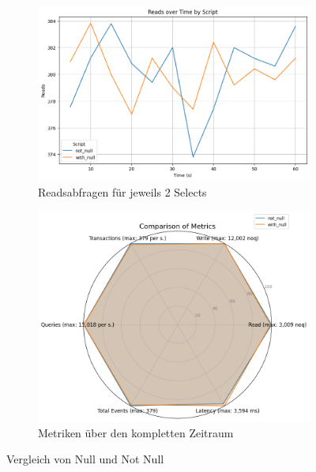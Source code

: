 \vspace{-15pt}
\begin{figure}[H]
    \centering
    \begin{subfigure}[t]{0.48\textwidth}
        \centering
        \includegraphics[width=\textwidth]{PNGs/Script/Data_Types/Null/null-check/Reads}
        \caption{Readsabfragen für jeweils 2 Selects}
        \label{data-types-null-reads}
    \end{subfigure}
    \hfill
    \begin{subfigure}[t]{0.48\textwidth}
        \centering
        \includegraphics[width=\textwidth]{PNGs/Script/Data_Types/Null/null-check/statistics}
        \caption{Metriken über den kompletten Zeitraum}
        \label{fig:data-types-null-statistics}
    \end{subfigure}
    \caption[Datentypen: Null und Not Null]{Vergleich von Null und Not Null}
\end{figure}
\vspace{-20pt}

